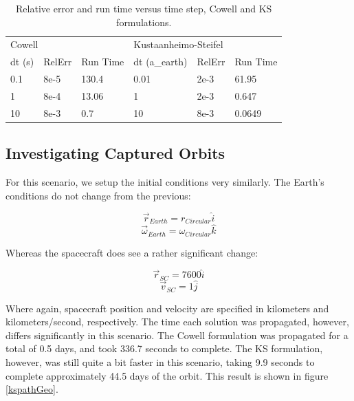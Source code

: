 \documentclass[11pt,twoside,letterpaper]{article}
\begin{document}
  \begin{table}[] \label{resultsTab}
    \centering
    \begin{tabular}{llllll}
      \multicolumn{3}{l}{Cowell} & \multicolumn{3}{l}{Kustaanheimo-Steifel} \\
      dt (s) & RelErr & Run Time & dt (a\_earth) & RelErr & Run Time \\ \hline
      \multicolumn{1}{|l|}{0.1} & \multicolumn{1}{l|}{8e-5} & \multicolumn{1}{l|}{130.4} & \multicolumn{1}{l|}{0.01} & \multicolumn{1}{l|}{2e-3} & \multicolumn{1}{l|}{61.95} \\ \hline
      \multicolumn{1}{|l|}{1} & \multicolumn{1}{l|}{8e-4} & \multicolumn{1}{l|}{13.06} & \multicolumn{1}{l|}{1} & \multicolumn{1}{l|}{2e-3} & \multicolumn{1}{l|}{0.647} \\ \hline
      \multicolumn{1}{|l|}{10} & \multicolumn{1}{l|}{8e-3} & \multicolumn{1}{l|}{0.7} & \multicolumn{1}{l|}{10} & \multicolumn{1}{l|}{8e-3} & \multicolumn{1}{l|}{0.0649} \\ \hline
    \end{tabular}
    \caption{Relative error and run time versus time step, Cowell and KS formulations.}
  \end{table}

  \subsection{Investigating Captured Orbits}
  For this scenario, we setup the initial conditions very
  similarly. The Earth's conditions do not change from the previous:

  \begin{equation} \label{ics}
    \vec{r}_{Earth} = r_{Circular}\hat{i}
  \end{equation}
  \begin{equation}
    \vec{\omega}_{Earth} = \omega_{Circular}\hat{k}
  \end{equation}

  Whereas the spacecraft does see a rather significant change:
  
  \begin{equation}
    \vec{r}_{SC} = 7600\hat{i}
  \end{equation}
  \begin{equation}
    \vec{v}_{SC} = 1\hat{j}
  \end{equation}

  Where again, spacecraft position and velocity are specified in
  kilometers and kilometers/second, respectively. The time each
  solution was propagated, however, differs significantly in this
  scenario. The Cowell formulation was propagated for a total of 0.5
  days, and took 336.7 seconds to complete. The KS formulation,
  however, was still quite a bit faster in this scenario, taking 9.9
  seconds to complete approximately 44.5 days of the orbit. This
  result is shown in figure \ref{kspathGeo}. 
\end{document}
